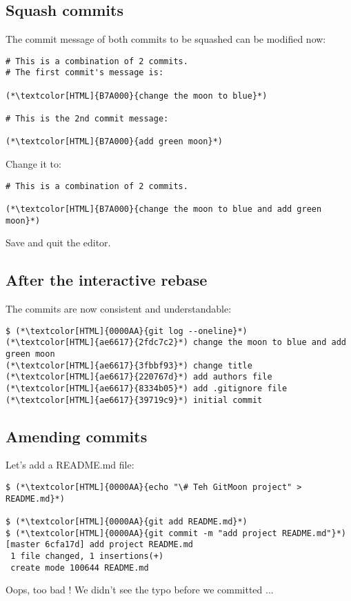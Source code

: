 \subsection{Squash commits}
\begin{frame}[fragile]
  \subslidetitle
  The commit message of both commits to be squashed can be modified now:
  \begin{lstlisting}
# This is a combination of 2 commits.
# The first commit's message is:

(*\textcolor[HTML]{B7A000}{change the moon to blue}*)

# This is the 2nd commit message:

(*\textcolor[HTML]{B7A000}{add green moon}*)
\end{lstlisting}

  Change it to:
  \begin{lstlisting}
# This is a combination of 2 commits.

(*\textcolor[HTML]{B7A000}{change the moon to blue and add green moon}*)

\end{lstlisting}
  Save and quit the editor.
\end{frame}

\subsection{After the interactive rebase}
\begin{frame}[fragile]
  \subslidetitle

  The commits are now consistent and understandable:
  \begin{lstlisting}
$ (*\textcolor[HTML]{0000AA}{git log --oneline}*)
(*\textcolor[HTML]{ae6617}{2fdc7c2}*) change the moon to blue and add green moon
(*\textcolor[HTML]{ae6617}{3fbbf93}*) change title
(*\textcolor[HTML]{ae6617}{220767d}*) add authors file
(*\textcolor[HTML]{ae6617}{8334b05}*) add .gitignore file
(*\textcolor[HTML]{ae6617}{39719c9}*) initial commit
\end{lstlisting}

\end{frame}


\subsection{Amending commits}
\begin{frame}[fragile]
  \subslidetitle

  Let's add a README.md file:

  \begin{lstlisting}
$ (*\textcolor[HTML]{0000AA}{echo "\# Teh GitMoon project" > README.md}*)

$ (*\textcolor[HTML]{0000AA}{git add README.md}*)
$ (*\textcolor[HTML]{0000AA}{git commit -m "add project README.md"}*)
[master 6cfa17d] add project README.md
 1 file changed, 1 insertions(+)
 create mode 100644 README.md
\end{lstlisting}

  \vspace{1em}
  Oops, too bad ! We didn't see the typo before we committed ...
\end{frame}



